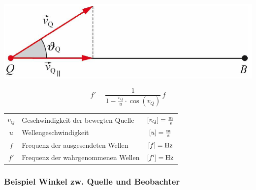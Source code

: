 \begin{minipage}{0.48\linewidth}
\includegraphics[width=0.98\linewidth]{Bilder/Wellen-Optik/bewegte_quelle_winkel} \\
\end{minipage}
\hfill
\begin{minipage}{0.48\linewidth}
$$ \boxed{ f' =  \frac{1}{1 - \frac{v_Q}{u} \cdot \cos(v_Q)}  \, f} $$
\end{minipage}



\begin{tabular}{clc}
$v_Q$ & Geschwindigkeit der bewegten Quelle & $[v_Q] = \frac{\mathrm{m}}{\mathrm{s}}$ \\
$u$ & Wellengeschwindigkeit & $[u] = \frac{\mathrm{m}}{\mathrm{s}}$ \\
$f$ & Frequenz der ausgesendeten Wellen & $[f] = \mathrm{Hz}$ \\
$f'$ & Frequenz der wahrgenommenen Wellen & $[f'] = \mathrm{Hz}$ \\
\end{tabular}



\subsubsection{Beispiel Winkel zw. Quelle und Beobachter}

